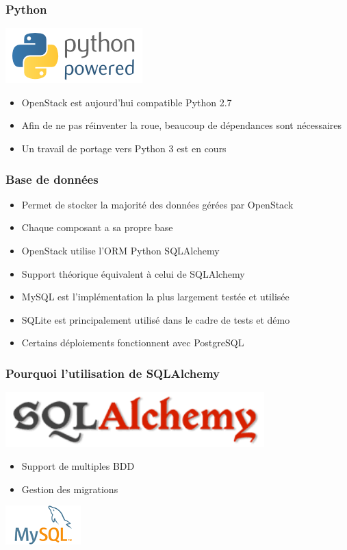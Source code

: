   \begin{frame}
    \frametitle{Python}
    \begin{center}
      \includegraphics{images/python-powered.png}
    \end{center}
    \begin{itemize}
      \item OpenStack est aujourd'hui compatible Python 2.7
      \item Afin de ne pas réinventer la roue, beaucoup de dépendances sont nécessaires
      \item Un travail de portage vers Python 3 est en cours
    \end{itemize}
  \end{frame}

  \begin{frame}
    \frametitle{Base de données}
    \begin{itemize}
      \item Permet de stocker la majorité des données gérées par OpenStack
      \item Chaque composant a sa propre base
      \item OpenStack utilise l'ORM Python SQLAlchemy
      \item Support théorique équivalent à celui de SQLAlchemy
      \item MySQL est l'implémentation la plus largement testée et utilisée
      \item SQLite est principalement utilisé dans le cadre de tests et démo
      \item Certains déploiements fonctionnent avec PostgreSQL
    \end{itemize}
  \end{frame}

  \begin{frame}
    \frametitle{Pourquoi l'utilisation de SQLAlchemy}
    \begin{center}
      \includegraphics[width=10cm]{images/sqlalchemy-logo.png}
    \end{center}
    \begin{itemize}
      \item Support de multiples BDD
      \item Gestion des migrations
    \end{itemize}
    \begin{center}
      \includegraphics{images/mysql-logo.png}
    \end{center}
  \end{frame}

